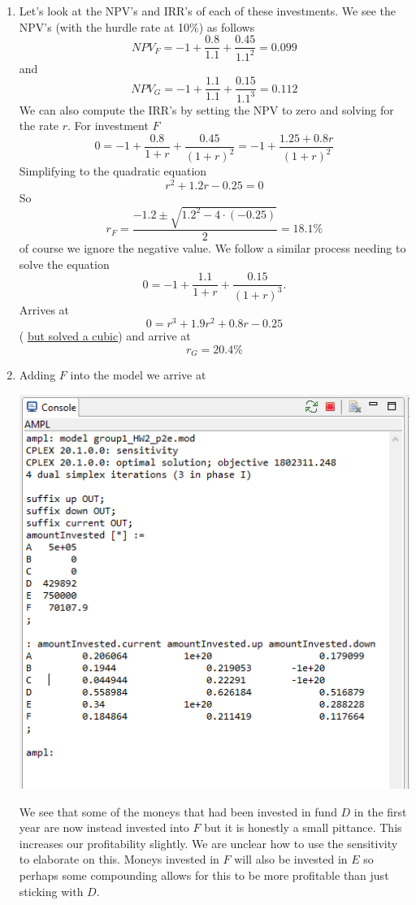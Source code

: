 \documentclass[11pt]{article}
\begin{document}
\begin{enumerate}
\begin{enumerate}
\item Let's look at the NPV's and IRR's of each of these investments.  We see the NPV's (with the hurdle rate at 10\%) as follows
\[
NPV_F = -1+\frac{0.8}{1.1} +\frac{0.45}{1.1^2} = 0.099
\]
and
\[
NPV_G = -1 +\frac{1.1}{1.1} +\frac{0.15}{1.1^3} = 0.112
\]
We can also compute the IRR's by setting the NPV to zero and solving for the rate $r$.  For investment $F$
\[
0 = -1 +\frac{0.8}{1+r} +\frac{0.45}{(1+r)^2} = -1 +\frac{1.25+0.8r}{(1+r)^2}
\]
Simplifying to the quadratic equation
\[
r^2+1.2r-0.25 = 0
\]
So 
\[
r_F = \frac{-1.2\pm\sqrt{1.2^2-4\cdot(-0.25)}}{2} = 18.1\%
\]
of course we ignore the negative value.  We follow a similar process needing to solve the equation
\[
0 = -1 +\frac{1.1}{1+r} +\frac{0.15}{(1+r)^3}.
\]
Arrives at 
\[
0 =r^3+1.9r^2+0.8r-0.25
\]
( \href{https://www.calculatorsoup.com/calculators/algebra/cubicequation.php?a=1\&b=1.9\&c=.8\&d=-.25\&action=solve}{but solved a cubic}) and arrive at
\[
r_G = 20.4\%
\]
\item Adding $F$ into the model we arrive at


\includegraphics[width = .9\textwidth]{output2e.png}

We see that some of the moneys that had been invested in fund $D$ in the first year are now instead invested into $F$ but it is honestly a small pittance.  This increases our profitability slightly.  We are unclear how to use the sensitivity to elaborate on this.  Moneys invested in $F$ will also be invested in $E$ so perhaps some compounding allows for this to be more profitable than just sticking with $D$.
\end{enumerate}
\end{enumerate}
\end{document}
